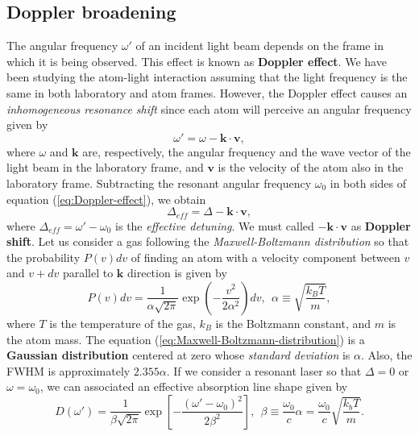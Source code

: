 \subsection{Doppler broadening}
\label{sec:Doppler-broadening}

The angular frequency $ \omega' $ of an incident light beam depends on the frame in which it is being observed. This effect is known as \textbf{Doppler effect}. We have been studying the atom-light interaction assuming that the light frequency is the same in both laboratory and atom frames. However, the Doppler effect causes an \textit{inhomogeneous resonance shift} since each atom will perceive an angular frequency given by
\begin{equation}
	\omega' = \omega - \mathbf{k} \cdot \mathbf{v},
	\label{eq:Doppler-effect}
\end{equation}
where $ \omega $ and $ \mathbf{k} $ are, respectively, the angular frequency and the wave vector of the light beam in the laboratory frame, and $ \mathbf{v} $ is the velocity of the atom also in the laboratory frame. Subtracting the resonant angular frequency $ \omega_0 $ in both sides of equation (\ref{eq:Doppler-effect}), we obtain
\begin{equation}
	\Delta_{eff} = \Delta - \mathbf{k} \cdot \mathbf{v},
	\label{eq:Doppler-shift}
\end{equation}
where $ \Delta_{eff} = \omega' - \omega_0 $ is the \textit{effective detuning}. We must called $ -\mathbf{k} \cdot \mathbf{v} $ as \textbf{Doppler shift}. Let us consider a gas following the \textit{Maxwell-Boltzmann distribution} so that the probability $ P(v) dv $ of finding an atom with a velocity component between $ v $ and $ v + dv $ parallel to $ \mathbf{k} $ direction is given by
\begin{equation}
	P(v) dv = \frac{1}{\alpha\sqrt{2\pi}} \exp\left(-\frac{v^2}{2\alpha^2}\right) dv,\ \ \alpha \equiv \sqrt{\frac{k_B T}{m}},
	\label{eq:Maxwell-Boltzmann-distribution}
\end{equation}
where $ T $ is the temperature of the gas, $ k_B $ is the Boltzmann constant, and $ m $ is the atom mass. The equation (\ref{eq:Maxwell-Boltzmann-distribution}) is a \textbf{Gaussian distribution} centered at zero whose \textit{standard deviation} is $ \alpha $. Also, the FWHM is approximately $ 2.355 \alpha $. If we consider a resonant laser so that $ \Delta = 0 $ or $ \omega = \omega_0 $, we can associated an effective absorption line shape given by
\begin{equation}
	D(\omega') = \frac{1}{\beta \sqrt{2\pi}} \exp\left[-\frac{(\omega' - \omega_0)^2}{2\beta^2}\right],\ \ \beta \equiv \frac{\omega_0}{c} \alpha = \frac{\omega_0}{c} \sqrt{\frac{k_b T}{m}}.
\end{equation}